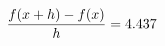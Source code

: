 \documentclass[preview]{standalone}
\begin{document}
\begin{align*}
\special{dvisvgm:raw <g id='unique000'>}\frac{f(x+h)-f(x)}{h} = 4.437\special{dvisvgm:raw </g>}
\end{align*}
\end{document}
